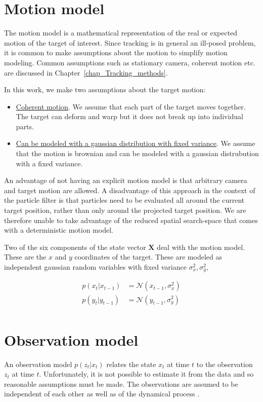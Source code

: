 \section{Motion model}
The motion model is a mathematical representation of the real or expected motion of the target of interest.  Since tracking is in general an ill-posed problem, it is common to make assumptions about the motion to simplify motion modeling.  Common assumptions such as stationary camera, coherent motion etc. are discussed in Chapter~\ref{chap_Tracking_methods}.

In this work, we make two assumptions about the target motion:

\begin{itemize}
\item \underline{Coherent motion}.  We assume that each part of the target moves together.  The target can deform and warp but it does not break up into individual parts.
\item \underline{Can be modeled with a gaussian distribution with fixed variance}.  We assume that the motion is brownian and can be modeled with a gaussian distrubution with a fixed variance.  
\end{itemize}

An advantage of not having an explicit motion model is that arbitrary camera and target motion are allowed.  A disadvantage of this approach in the context of the particle filter is that particles need to be evaluated all around the current target position, rather than only around the projected target position.  We are therefore unable to take advantage of the reduced spatial search-space that comes with a deterministic motion model.  

Two of the six components of the state vector $\mathbf{X}$ deal with the motion model.  These are the $x$ and $y$ coordinates of the target.  These are modeled as independent gaussian random variables with fixed variance $\sigma_x^2, \sigma_y^2$,

\begin{align*}
p(x_t|x_{t-1}) &= \mathcal{N}(x_{t-1}, \sigma_x^2) \\
p(y_t|y_{t-1}) &= \mathcal{N}(y_{t-1}, \sigma_y^2) \\
\end{align*}

\section{Observation model}
An observation model $p(z_t|x_t)$ relates the state $x_t$ at time $t$ to the observation $z_t$ at time $t$.  Unfortunately, it is not possible to estimate it from the data and so reasonable assumptions must be made.  The observations are assumed to be independent of each other as well as of the dynamical process \cite{1998_JNL_Condensation_IsardBlake}. 

